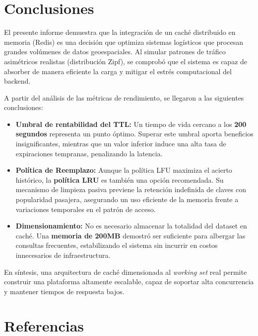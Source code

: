 \documentclass[letter,12pt]{article}
\begin{document}
\section{Conclusiones}

El presente informe demuestra que la integración de un caché distribuido en memoria (Redis) es
una decisión que optimiza sistemas logísticos que procesan grandes volúmenes de datos geoespaciales.
Al simular patrones de tráfico asimétricos realistas (distribución Zipf), se comprobó que el
sistema es capaz de absorber de manera eficiente la carga y mitigar el estrés computacional
del backend.

A partir del análisis de las métricas de rendimiento, se llegaron a las siguientes conclusiones:

\begin{itemize}
    \item \textbf{Umbral de rentabilidad del TTL:} Un tiempo de vida cercano a los \textbf{200 segundos}
    representa un punto óptimo. Superar este umbral aporta beneficios insignificantes, mientras que
    un valor inferior induce una alta tasa de expiraciones tempranas, penalizando la latencia.

    \item \textbf{Política de Reemplazo:} Aunque la política LFU maximiza el acierto histórico,
    la \textbf{política LRU} es también una opción recomendada. Su mecanismo de limpieza pasiva
    previene la retención indefinida de claves con popularidad pasajera, asegurando un uso eficiente
    de la memoria frente a variaciones temporales en el patrón de acceso.

    \item \textbf{Dimensionamiento:} No es necesario almacenar la totalidad del dataset en caché.
    Una \textbf{memoria de 200MB} demostró ser suficiente para albergar las consultas frecuentes,
    estabilizando el sistema sin incurrir en costos innecesarios de infraestructura.
\end{itemize}

En síntesis, una arquitectura de caché dimensionada al \textit{working set} real permite construir
una plataforma altamente escalable, capaz de soportar alta concurrencia y mantener tiempos de
respuesta bajos.

\section{Referencias}
\end{document}
